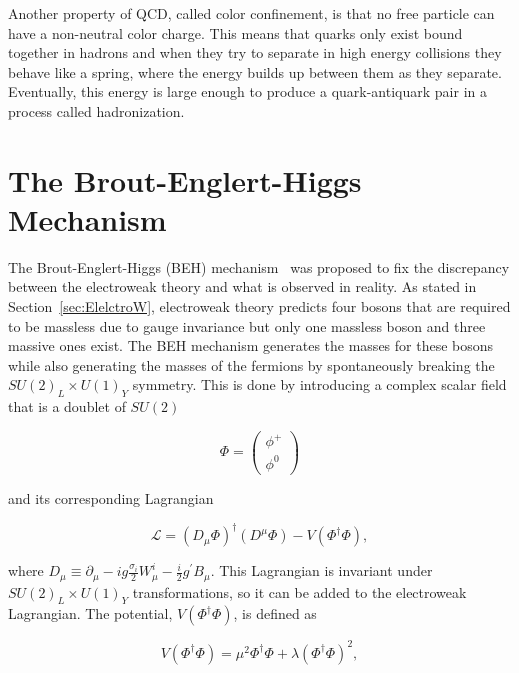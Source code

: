 Another property of QCD, called color confinement, is that no free particle can have a non-neutral color charge. This means that quarks only exist bound together in hadrons and when they try to separate in high energy collisions they behave like a spring, where the energy builds up between them as they separate. Eventually, this energy is large enough to produce a quark-antiquark pair in a process called hadronization. 


\section{The Brout-Englert-Higgs Mechanism}
\label{sec:BEHmechanism}

The Brout-Englert-Higgs (BEH) mechanism~\cite{BEmechanism,Hmechanism} was proposed to fix the discrepancy between the electroweak theory and what is observed in reality. As stated in Section~\ref{sec:ElelctroW}, electroweak theory predicts four bosons that are required to be massless due to gauge invariance but only one massless boson and three massive ones exist. The BEH mechanism generates the masses for these bosons while also generating the masses of the fermions by spontaneously breaking the $SU(2)_{L}\times U(1)_{Y}$ symmetry. This is done by introducing a complex scalar field that is a doublet of $SU(2)$

\begin{equation}
\Phi = 
\begin{pmatrix}
\phi^{+}\\
\phi^{0}
\end{pmatrix}
\end{equation}

\noindent
and its corresponding Lagrangian

\begin{equation}
\label{eq:HiggsLag}
\mathcal{L} = (D_{\mu}\Phi)^{\dag}(D^{\mu}\Phi) - V(\Phi^{\dag}\Phi),
\end{equation}

\noindent
where $D_{\mu}\equiv \partial_{\mu} - ig\frac{\sigma_{i}}{2}W^{i}_{\mu} - \frac{i}{2}g^{\prime}B_{\mu}$. This Lagrangian is invariant under $SU(2)_{L}\times U(1)_{Y}$ transformations, so it can be added to the electroweak Lagrangian. The potential, $V(\Phi^{\dag}\Phi)$, is defined as

\begin{equation}
V(\Phi^{\dag}\Phi)=\mu^{2}\Phi^{\dag}\Phi+\lambda(\Phi^{\dag}\Phi)^{2},
\end{equation}

